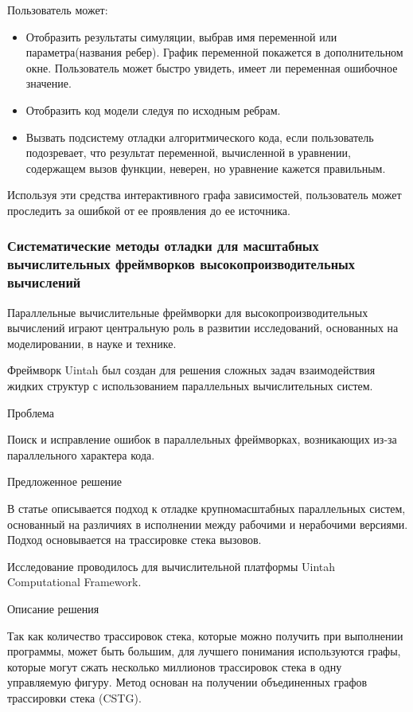 Пользователь может:
\begin{itemize}
	\item Отобразить результаты симуляции, выбрав имя переменной или параметра(названия ребер). График переменной покажется в дополнительном окне. Пользователь может быстро увидеть, имеет ли переменная ошибочное значение.
	\item Отобразить код модели следуя по исходным ребрам.
	\item Вызвать подсистему отладки алгоритмического кода, если пользователь подозревает, что результат переменной, вычисленной в уравнении, содержащем вызов функции, неверен, но уравнение кажется правильным.
\end{itemize}

Используя эти средства интерактивного графа зависимостей, пользователь может проследить за ошибкой от ее проявления до ее источника.

\subsubsection{Систематические методы отладки для масштабных вычислительных фреймворков высокопроизводительных вычислений \cite{Humphrey2014}}

Параллельные вычислительные фреймворки для высокопроизводительных вычислений играют центральную роль в развитии исследований, основанных на моделировании, в науке и технике.

Фреймворк Uintah был создан для решения сложных задач взаимодействия жидких структур с использованием параллельных вычислительных систем.
\newline

Проблема

Поиск и исправление ошибок в параллельных фреймворках, возникающих из-за параллельного характера кода.
\newline

Предложенное решение

В статье описывается подход к отладке крупномасштабных параллельных систем, основанный на различиях в исполнении между рабочими и нерабочими версиями. Подход основывается на трассировке стека вызовов.

Исследование проводилось для вычислительной платформы Uintah Computational Framework.
\newline

Описание решения

Так как количество трассировок стека, которые можно получить при выполнении программы, может быть большим, для лучшего понимания используются графы, которые могут сжать несколько миллионов трассировок стека в одну управляемую фигуру. Метод основан на получении объединенных графов трассировки стека (CSTG). 

